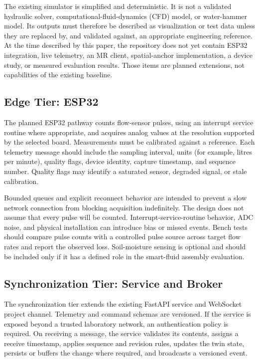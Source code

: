 \documentclass[conference]{IEEEtran}
\begin{document}
The existing simulator is simplified and deterministic. It is not a validated hydraulic solver, computational-fluid-dynamics (CFD) model, or water-hammer model. Its outputs must therefore be described as visualization or test data unless they are replaced by, and validated against, an appropriate engineering reference. At the time described by this paper, the repository does not yet contain ESP32 integration, live telemetry, an MR client, spatial-anchor implementation, a device study, or measured evaluation results. Those items are planned extensions, not capabilities of the existing baseline.

\subsection{Edge Tier: ESP32}
The planned ESP32 pathway counts flow-sensor pulses, using an interrupt service routine where appropriate, and acquires analog values at the resolution supported by the selected board. Measurements must be calibrated against a reference. Each telemetry message should include the sampling interval, units (for example, litres per minute), quality flags, device identity, capture timestamp, and sequence number. Quality flags may identify a saturated sensor, degraded signal, or stale calibration.

Bounded queues and explicit reconnect behavior are intended to prevent a slow network connection from blocking acquisition indefinitely. The design does not assume that every pulse will be counted. Interrupt-service-routine behavior, ADC noise, and physical installation can introduce bias or missed events. Bench tests should compare pulse counts with a controlled pulse source across target flow rates and report the observed loss. Soil-moisture sensing is optional and should be included only if it has a defined role in the smart-fluid assembly evaluation.

\subsection{Synchronization Tier: Service and Broker}
The synchronization tier extends the existing FastAPI service and WebSocket project channel. Telemetry and command schemas are versioned. If the service is exposed beyond a trusted laboratory network, an authentication policy is required. On receiving a message, the service validates its contents, assigns a receive timestamp, applies sequence and revision rules, updates the twin state, persists or buffers the change where required, and broadcasts a versioned event.
\end{document}
